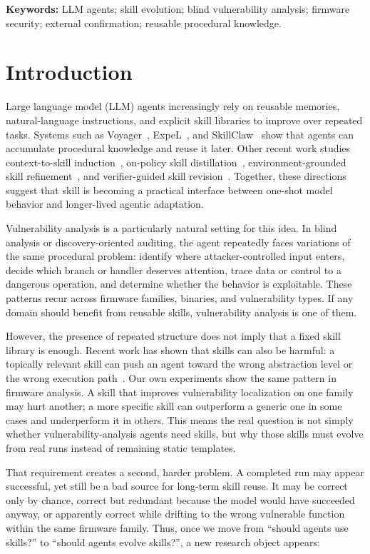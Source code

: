 \documentclass[11pt]{article}
\begin{document}
\noindent\textbf{Keywords:} LLM agents; skill evolution; blind vulnerability analysis;
firmware security; external confirmation; reusable procedural knowledge.

\section{Introduction}
\label{sec:intro}

Large language model (LLM) agents increasingly rely on reusable memories, natural-language
instructions, and explicit skill libraries to improve over repeated tasks.  Systems such
as Voyager~\cite{voyager}, ExpeL~\cite{expel}, and SkillClaw~\cite{skillclaw} show that
agents can accumulate procedural knowledge and reuse it later.  Other recent work studies
context-to-skill induction~\cite{ctx2skill}, on-policy skill distillation~\cite{opid},
environment-grounded skill refinement~\cite{spark,skillevolbench}, and verifier-guided
skill revision~\cite{trace2skill,veriskill}.  Together, these directions suggest that
skill is becoming a practical interface between one-shot model behavior and longer-lived
agentic adaptation.

Vulnerability analysis is a particularly natural setting for this idea.  In blind
analysis or discovery-oriented auditing, the agent repeatedly faces variations of the
same procedural problem: identify where attacker-controlled input enters, decide which
branch or handler deserves attention, trace data or control to a dangerous operation,
and determine whether the behavior is exploitable.  These patterns recur across firmware
families, binaries, and vulnerability types.  If any domain should benefit from reusable
skills, vulnerability analysis is one of them.

However, the presence of repeated structure does not imply that a fixed skill library is
enough.  Recent work has shown that skills can also be harmful: a topically relevant
skill can push an agent toward the wrong abstraction level or the wrong execution
path~\cite{skillharmful}.  Our own experiments show the same pattern in firmware
analysis.  A skill that improves vulnerability localization on one family may hurt
another; a more specific skill can outperform a generic one in some cases and underperform
it in others.  This means the real question is not simply whether vulnerability-analysis
agents need skills, but why those skills must evolve from real runs instead of remaining
static templates.

That requirement creates a second, harder problem.  A completed run may appear
successful, yet still be a bad source for long-term skill reuse.  It may be correct only
by chance, correct but redundant because the model would have succeeded anyway, or
apparently correct while drifting to the wrong vulnerable function within the same
firmware family.  Thus, once we move from ``should agents use skills?'' to ``should
agents evolve skills?'', a new research object appears:
\end{document}
